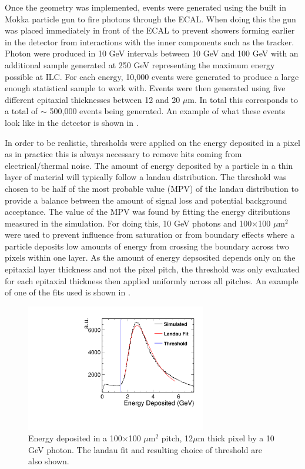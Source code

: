 Once the geometry was implemented, events were generated using the built in Mokka particle gun to fire photons through the \ac{ECAL}. When doing this the gun was placed immediately in front of the \ac{ECAL} to prevent showers forming earlier in the detector from interactions with the inner components such as the tracker. Photon were produced in 10 GeV intervals between 10 GeV and 100 GeV with an additional sample generated at 250 GeV representing the maximum energy possible at \ac{ILC}. For each energy, 10,000 events were generated to produce a large enough statistical sample to work with. Events were then generated using five different epitaxial thicknesses between 12 and 20 $\mu$m. In total this corresponds to a total of $\sim$ 500,000 events being generated. An example of what these events look like in the detector is shown in .

In order to be realistic, thresholds were applied on the energy deposited in a pixel as in practice this is always necessary to remove hits coming from electrical/thermal noise. The amount of energy deposited by a particle in a thin layer of material will typically follow a landau distribution. The threshold was chosen to be half of the most probable value (MPV) of the landau distribution to provide a balance between the amount of signal loss and potential background acceptance. The value of the MPV was found by fitting the energy ditributions measured in the simulation. For doing this, 10 GeV photons and 100$\times$100 $\mu$m$^2$ were used to prevent influence from saturation or from boundary effects where a particle deposits low amounts of energy from crossing the boundary across two pixels within one layer. As the amount of energy depsosited depends only on the epitaxial layer thickness and not the pixel pitch, the threshold was only evaluated for each epitaxial thickness then applied uniformly across all pitches. An example of one of the fits used is shown in .

\begin{figure}
  \centering
  \includegraphics[width=0.7\textwidth,keepaspectratio]{DECALStudies/fig/Landau_100x12_10GeV.pdf}
  \caption{Energy deposited in a 100$\times$100 $\mu$m$^2$ pitch, 12$\mu$m thick pixel by a 10 GeV photon. The landau fit and resulting choice of threshold are also shown.}
  \label{fig:thresholdfit}
\end{figure}


